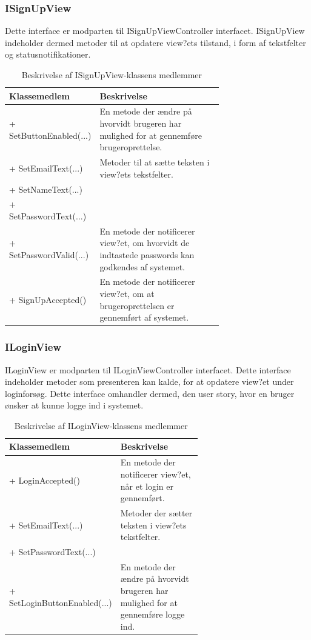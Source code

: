\subsubsection{ISignUpView}
Dette interface er modparten til ISignUpViewController interfacet. ISignUpView indeholder dermed metoder til at opdatere view?ets tilstand, i form af tekstfelter og statusnotifikationer.

\begin{table}
	\centering
	\begin{tabular}{| l | p{0.7\linewidth} |}
		\toprule
		\textbf{Klassemedlem}	& \textbf{Beskrivelse} \\
		\midrule
		+ SetButtonEnabled(...)				& En metode der ændre på hvorvidt brugeren har mulighed for at gennemføre brugeroprettelse.	\\\hline
		+ SetEmailText(...)				& Metoder til at sætte teksten i view?ets tekstfelter. \\
		+ SetNameText(...)				& \\
		+ SetPasswordText(...)				& \\\hline
		+ SetPasswordValid(...) 					& En metode der notificerer view?et, om hvorvidt de indtastede passwords kan godkendes af systemet. \\\hline
		+ SignUpAccepted()				& En metode der notificerer view?et, om at brugeroprettelsen er gennemført af systemet. \\
		\bottomrule
		\end{tabular}
	\caption{Beskrivelse af ISignUpView-klassens medlemmer}
	\label{tab:table_design_isignupview}	
\end{table}

\subsubsection{ILoginView}
ILoginView er modparten til ILoginViewController interfacet. Dette interface indeholder metoder som presenteren kan kalde, for at opdatere view?et under loginforsøg. Dette interface omhandler dermed, den user story, hvor en bruger ønsker at kunne logge ind i systemet.

\begin{table}
	\centering
	\begin{tabular}{| l | p{0.63\linewidth} |}
		\toprule
		\textbf{Klassemedlem}	& \textbf{Beskrivelse} \\
		\midrule
		+ LoginAccepted()				& En metode der notificerer view?et, når et login er gennemført.
	\\\hline
		+ SetEmailText(...)				& Metoder der sætter teksten i view?ets tekstfelter. \\
		+ SetPasswordText(...)				& \\\hline
		+ SetLoginButtonEnabled(...) 					& En metode der ændre på hvorvidt brugeren har mulighed for at gennemføre logge ind. \\
		\bottomrule
		\end{tabular}
	\caption{Beskrivelse af ILoginView-klassens medlemmer}
	\label{tab:table_design_iloginview}	
\end{table}

